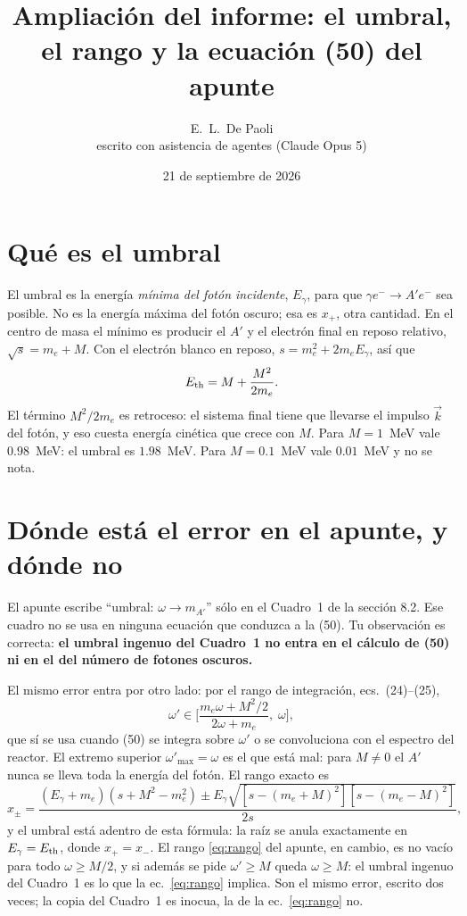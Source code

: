 \documentclass[11pt,a4paper]{article}
\title{Ampliación del informe: el umbral, el rango y la ecuación (50) del apunte}
\author{E.~L.~De Paoli\\[2pt]\small escrito con asistencia de agentes (Claude Opus 5)}
\date{21 de septiembre de 2026}
\newcommand{\Ap}{A'}
\begin{document}
\maketitle

\section{Qué es el umbral}
El umbral es la energía \emph{mínima del fotón incidente}, $E_\gamma$, para que $\gamma e^-\to \Ap e^-$ sea posible. No es la
energía máxima del fotón oscuro; esa es $x_+$, otra cantidad. En el centro de masa el mínimo es producir el $\Ap$ y el
electrón final en reposo relativo, $\sqrt s=m_e+M$. Con el electrón blanco en reposo, $s=m_e^2+2m_eE_\gamma$, así que
\begin{equation}
E_{\rm th}=M+\frac{M^2}{2m_e}.
\end{equation}
El término $M^2/2m_e$ es retroceso: el sistema final tiene que llevarse el impulso $\vec k$ del fotón, y eso cuesta energía
cinética que crece con $M$. Para $M=1$~MeV vale $0.98$~MeV: el umbral es $1.98$~MeV. Para $M=0.1$~MeV vale $0.01$~MeV y
no se nota.

\section{Dónde está el error en el apunte, y dónde no}
El apunte escribe ``umbral: $\omega\to m_{\Ap}$'' sólo en el Cuadro~1 de la sección 8.2. Ese cuadro no se usa en ninguna
ecuación que conduzca a la (50). Tu observación es correcta: \textbf{el umbral ingenuo del Cuadro~1 no entra en el
cálculo de (50) ni en el del número de fotones oscuros.}

El mismo error entra por otro lado: por el rango de integración, ecs.~(24)--(25),
\begin{equation}
\omega'\in\Big[\frac{m_e\omega+M^2/2}{2\omega+m_e},\;\omega\Big],
\label{eq:rango}
\end{equation}
que sí se usa cuando (50) se integra sobre $\omega'$ o se convoluciona con el espectro del reactor. El extremo superior
$\omega'_{\max}=\omega$ es el que está mal: para $M\neq0$ el $\Ap$ nunca se lleva toda la energía del fotón. El rango
exacto es
\begin{equation}
x_\pm=\frac{(E_\gamma+m_e)(s+M^2-m_e^2)\pm E_\gamma\sqrt{[s-(m_e+M)^2][s-(m_e-M)^2]}}{2s},
\end{equation}
y el umbral está adentro de esta fórmula: la raíz se anula exactamente en $E_\gamma=E_{\rm th}$, donde $x_+=x_-$. El
rango \eqref{eq:rango} del apunte, en cambio, es no vacío para todo $\omega\ge M/2$, y si además se pide $\omega'\ge M$
queda $\omega\ge M$: el umbral ingenuo del Cuadro~1 es lo que la ec.~\eqref{eq:rango} implica. Son el mismo error, escrito
dos veces; la copia del Cuadro~1 es inocua, la de la ec.~\eqref{eq:rango} no.
\end{document}
